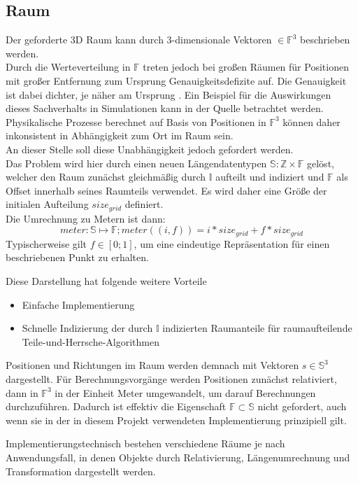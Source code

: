 \subsection{Raum}
\label{sec:space}
Der geforderte 3D Raum kann durch 3-dimensionale Vektoren $\in \mathbb{F}^3$ beschrieben werden.\\
Durch die Werteverteilung in $\mathbb{F}$ treten jedoch bei großen Räumen für Positionen mit großer Entfernung zum Ursprung Genauigkeitsdefizite auf. Die Genauigkeit ist dabei dichter, je näher am Ursprung \cite{floatdistribution}. Ein Beispiel für die Auswirkungen dieses Sachverhalts in Simulationen kann in der Quelle \cite{floatdistributionexample} betrachtet werden.\\
Physikalische Prozesse berechnet auf Basis von Positionen in $\mathbb{F}^3$ können daher inkonsistent in Abhängigkeit zum Ort im Raum sein.\\
An dieser Stelle soll diese Unabhängigkeit jedoch gefordert werden.\\
Das Problem wird hier durch einen neuen Längendatentypen $\mathbb{S} : \mathbb{Z} \times \mathbb{F}$ gelöst, welcher den Raum zunächst gleichmäßig durch $\mathbb{I}$ aufteilt und indiziert und $\mathbb{F}$ als Offset innerhalb seines Raumteils verwendet. Es wird daher eine Größe der initialen Aufteilung $size_{grid}$ definiert.\\
Die Umrechnung zu Metern ist dann: $$ meter: \mathbb{S} \mapsto \mathbb{F};  meter((i, f)) = i * size_{grid} + f * size_{grid}$$ 
Typischerweise gilt $f \in [0;1]$, um eine eindeutige Repräsentation für einen beschriebenen Punkt zu erhalten.

Diese Darstellung hat folgende weitere Vorteile
\begin{itemize}
\item Einfache Implementierung
\item Schnelle Indizierung der durch $\mathbb{I}$ indizierten Raumanteile für raumaufteilende Teile-und-Herrsche-Algorithmen
\end{itemize}

Positionen und Richtungen im Raum werden demnach mit Vektoren $s\in\mathbb{S}^3$ dargestellt. Für Berechnungsvorgänge werden Positionen zunächst relativiert, dann in $\mathbb{F}^3$ in der Einheit Meter umgewandelt, um darauf Berechnungen durchzuführen. Dadurch ist effektiv die Eigenschaft $\mathbb{F}\subset\mathbb{S}$ nicht gefordert, auch wenn sie in der in diesem Projekt verwendeten Implementierung prinzipiell gilt.

Implementierungstechnisch bestehen verschiedene Räume je nach Anwendungsfall, in denen Objekte durch Relativierung, Längenumrechnung und Transformation dargestellt werden.

